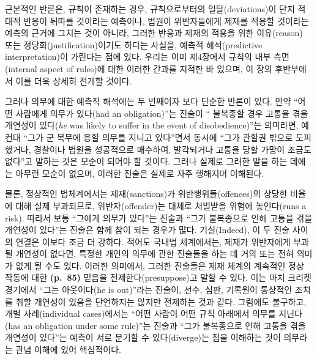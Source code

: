 근본적인 반론은, 규칙이 존재하는 경우, 규칙으로부터의 일탈(deviations)이
단지 적대적 반응이 뒤따를 것이라는 예측이나, 법원이 위반자들에게 제재를
적용할 것이라는 예측의 근거에 그치는 것이 아니라, 그러한 반응과 제재의
적용을 위한 이유(reason) 또는 정당화(justification)이기도 하다는 사실을,
예측적 해석(predictive interpretation)이 가린다는 점에 있다. 우리는 이미
제4장에서 규칙의 내부 측면(internal aspect of rules)에 대한 이러한
간과를 지적한 바 있으며, 이 장의 후반부에서 이를 더욱 상세히 전개할
것이다.

그러나 의무에 대한 예측적 해석에는 두 번째이자 보다 단순한 반론이 있다.
만약 “어떤 사람에게 의무가 있다(had an obligation)”는 진술이
“ 불복종할 경우 고통을 겪을 개연성이 있다(\emph{he}
was likely to suffer in the event of disobedience)”는 의미라면, 예컨대
“그가 군 복무에 응할 의무를 지니고 있다”면서 동시에 “그가 관할권
밖으로 도피했거나, 경찰이나 법원을 성공적으로 매수하여, 발각되거나
고통을 당할 가망이 조금도 없다”고 말하는 것은 모순이 되어야 할 것이다.
그러나 실제로 그러한 말을 하는 데에는 아무런 모순이 없으며, 이러한
진술은 실제로 자주 행해지며 이해된다.

물론, 정상적인 법체계에서는 제재(sanctions)가 위반행위들(offences)의
상당한 비율에 대해 실제 부과되므로, 위반자(offender)는 대체로 처벌받을
위험에 놓인다(runs a risk). 따라서 보통 “그에게 의무가 있다”는 진술과
“그가 불복종으로 인해 고통을 겪을 개연성이 있다”는 진술은 함께 참이
되는 경우가 많다. 기실(Indeed), 이 두 진술 사이의 연결은 이보다 조금 더
강하다. 적어도 국내법 체계에서는,  제재가
위반자에게 부과될 개연성이 없다면, 특정한 개인의 의무에 관한 진술들을
하는 데 거의 또는 전혀 의미가 없게 될 수도 있다. 이러한 의미에서, 그러한
진술들은 제재 체계의 계속적인 정상 작동에 대한 \textbf{(p.~85)} 믿음을
전제한다(presuppose)고 말할 수 있다. 이는 마치 크리켓 경기에서 “그는
아웃이다(he is out)”라는 진술이, 선수, 심판, 기록원이 통상적인 조치를
취할 개연성이 있음을 단언하지는 않지만 전제하는 것과 같다. 그럼에도
불구하고, 개별 사례(individual cases)에서는 “어떤 사람이 어떤 규칙
아래에서 의무를 지닌다(has an obligation under some rule)”는 진술과
“그가 불복종으로 인해 고통을 겪을 개연성이 있다”는 예측이 서로 분기할
수 있다(diverge)는 점을 이해하는 것이 의무라는 관념 이해에 있어
핵심적이다.

